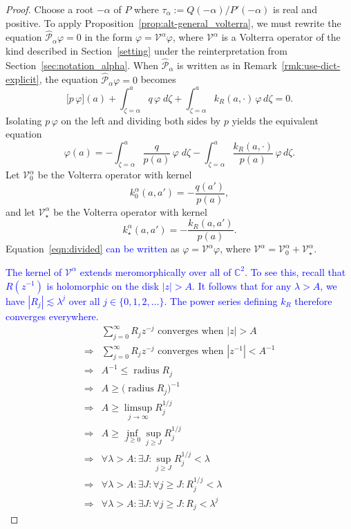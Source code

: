 \documentclass[review]{siamart220329}
\newcommand{\C}{\mathbb{C}}
\newcommand{\volterra}{\mathcal{V}}
\newcommand{\hardpart}{\mathcal{V}_0}
\newcommand{\softpart}{\mathcal{V}_\star}
\newcommand{\hardker}{k_0}
\newcommand{\softker}{k_\star}
\newenvironment{verify}{\color{veriforest}}{\color{black}}
\begin{document}
\begin{proof}
\color{blue}Choose a root $-\alpha$ of $P$ where $\tau_\alpha := Q(-\alpha)/P'(-\alpha)$ is real and positive. To apply Proposition~\ref{prop:alt-general_volterra}, we must rewrite the equation $\hat{\mathcal{P}}_{\alpha}\varphi = 0$ in the form $\varphi = \volterra^\alpha \varphi$, where $\volterra^\alpha$ is a Volterra operator of the kind described in Section~\ref{setting} under the reinterpretation from Section~\ref{sec:notation_alpha}. When $\hat{\mathcal{P}}_\alpha$ is written as in Remark~\ref{rmk:use-dict-explicit}, the equation $\hat{\mathcal{P}}_{\alpha} \varphi = 0$ becomes
\[ \big[ p\, \varphi \big](a) + \int_{\zeta=\alpha}^a q \, \varphi \; d\zeta + \int_{\zeta=\alpha}^a k_R(a,\cdot) \, \varphi \, d\zeta = 0. \]\color{black}
Isolating $p\,\varphi$ on the left and dividing both sides by $p$ yields the equivalent equation
\begin{equation}\label{eqn:divided}
\varphi(a) = -\int_{\zeta=\alpha}^a \frac{q}{p(a)} \, \varphi \; d\zeta - \int_{\zeta=\alpha}^a \frac{k_R(a,\cdot)}{p(a)} \, \varphi \, d\zeta.
\end{equation}
Let $\hardpart^\alpha$ be the Volterra operator with kernel
\[ \hardker^\alpha(a,a') = -\frac{q(a')}{p(a)}, \]
and let $\softpart^\alpha$ be the Volterra operator with kernel
\[ \softker^\alpha(a,a') = -\frac{k_R(a,a')}{p(a)}. \]
Equation~\eqref{eqn:divided} \textcolor{blue}{can be written} as $\varphi = \volterra^\alpha \varphi$, where $\volterra^\alpha = \hardpart^\alpha + \softpart^\alpha$.

\textcolor{blue}{The kernel of $\volterra^\alpha$ extends meromorphically over all of $\C^2$. To see this, recall that $R(z^{-1})$ is holomorphic on the disk $|z| > A$. It follows that for any $\lambda > A$, we have $|R_j| \lesssim \lambda^j$ over all $j \in \{0, 1, 2, \ldots\}$. The power series defining $k_R$ therefore converges everywhere.}
\begin{verify}
\begin{align*}
& \sum_{j = 0}^\infty R_j z^{-j} \text{ converges when } |z| > A \\
\Longrightarrow & \sum_{j = 0}^\infty R_j z^{-j} \text{ converges when } |z^{-1}| < A^{-1} \\
\Longrightarrow & A^{-1} \le \operatorname{radius} R_j \\
\Longrightarrow & A \ge \big(\operatorname{radius} R_j\big)^{-1} \\
\Longrightarrow & A \ge \limsup_{j \to \infty} R_j^{1/j} \\
\Longrightarrow & A \ge \inf_{J \ge 0} \sup_{j \ge J} R_j^{1/j} \\
\Longrightarrow & \forall \lambda > A: \exists J: \sup_{j \ge J} R_j^{1/j} < \lambda \\
\Longrightarrow & \forall \lambda > A: \exists J: \forall j \ge J: R_j^{1/j} < \lambda \\
\Longrightarrow & \forall \lambda > A: \exists J: \forall j \ge J: R_j < \lambda^j
\end{align*}
\end{verify}


\end{proof}
\end{document}
